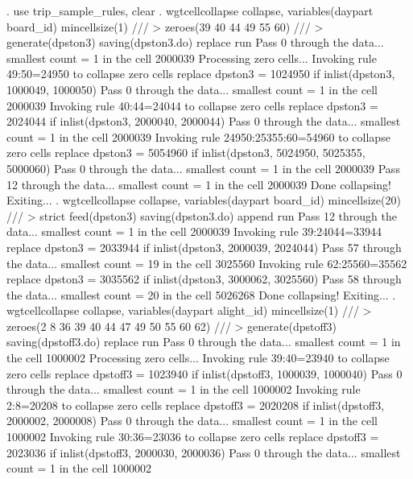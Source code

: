 . use trip_sample_rules, clear
{\smallskip}
. wgtcellcollapse collapse, variables(daypart board_id) mincellsize(1) ///
>         zeroes(39 40 44 49 55 60) ///
>         generate(dpston3) saving(dpston3.do) replace run
Pass 0 through the data...
  smallest count = 1 in the cell      2000039
{\smallskip}
Processing zero cells...
{\smallskip}
  Invoking rule 49:50=24950 to collapse zero cells
  replace dpston3 = 1024950 if inlist(dpston3, 1000049, 1000050)
Pass 0 through the data...
  smallest count = 1 in the cell      2000039
  Invoking rule 40:44=24044 to collapse zero cells
  replace dpston3 = 2024044 if inlist(dpston3, 2000040, 2000044)
\smallskip
\oom
\smallskip
Pass 0 through the data...
  smallest count = 1 in the cell      2000039
  Invoking rule 24950:25355:60=54960 to collapse zero cells
  replace dpston3 = 5054960 if inlist(dpston3, 5024950, 5025355, 5000060)
Pass 0 through the data...
  smallest count = 1 in the cell      2000039
Pass 12 through the data...
  smallest count = 1 in the cell      2000039
  Done collapsing! Exiting...
{\smallskip}
. wgtcellcollapse collapse, variables(daypart board_id) mincellsize(20) ///
>         strict feed(dpston3) saving(dpston3.do) append run
Pass 12 through the data...
  smallest count = 1 in the cell      2000039
  Invoking rule 39:24044=33944
  replace dpston3 = 2033944 if inlist(dpston3, 2000039, 2024044)
\smallskip
\oom
\smallskip
Pass 57 through the data...
  smallest count = 19 in the cell      3025560
  Invoking rule 62:25560=35562
  replace dpston3 = 3035562 if inlist(dpston3, 3000062, 3025560)
Pass 58 through the data...
  smallest count = 20 in the cell      5026268
  Done collapsing! Exiting...
{\smallskip}
. wgtcellcollapse collapse, variables(daypart alight_id) mincellsize(1) ///
>         zeroes(2 8 36 39 40 44 47 49 50 55 60 62) ///
>         generate(dpstoff3) saving(dpstoff3.do) replace run
Pass 0 through the data...
  smallest count = 1 in the cell      1000002
{\smallskip}
Processing zero cells...
{\smallskip}
  Invoking rule 39:40=23940 to collapse zero cells
  replace dpstoff3 = 1023940 if inlist(dpstoff3, 1000039, 1000040)
Pass 0 through the data...
  smallest count = 1 in the cell      1000002
  Invoking rule 2:8=20208 to collapse zero cells
  replace dpstoff3 = 2020208 if inlist(dpstoff3, 2000002, 2000008)
Pass 0 through the data...
  smallest count = 1 in the cell      1000002
  Invoking rule 30:36=23036 to collapse zero cells
  replace dpstoff3 = 2023036 if inlist(dpstoff3, 2000030, 2000036)
\smallskip
\oom
\smallskip
Pass 0 through the data...
  smallest count = 1 in the cell      1000002

